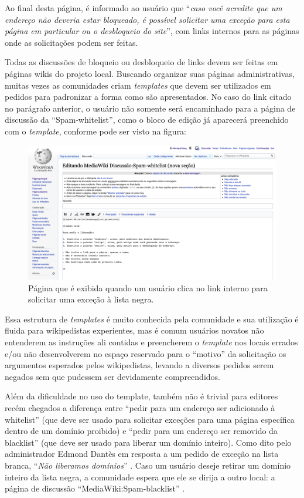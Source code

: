 Ao final desta página, é informado ao usuário que ``\textit{caso você acredite que um endereço não deveria estar bloqueado, é possível solicitar uma exceção para esta página em particular ou o desbloqueio do site}'', com links internos para as páginas onde as solicitações podem ser feitas.

Todas as discussões de bloqueio ou desbloqueio de links devem ser feitas em páginas wikis do projeto local. Buscando organizar suas páginas administrativas, muitas vezes as comunidades criam \textit{templates} que devem ser utilizados em pedidos para padronizar a forma como são apresentados. No caso do link citado no parágrafo anterior, o usuário não somente será encaminhado para a página de discussão da ``Spam-whitelist'', como o bloco de edição já aparecerá preenchido com o \textit{template}, conforme pode ser visto na figura:

\begin{figure}[H]
    \centering
    \includegraphics[width=1\textwidth]{Images/mediawiki_spam_whitelist.png}
    \caption{Página que é exibida quando um usuário clica no link interno para solicitar uma exceção à lista negra.}
    \label{fig:mediawiki_spam_whitelist}
\end{figure}

Essa estrutura de \textit{templates} é muito conhecida pela comunidade e sua utilização é fluida para wikipedistas experientes, mas é comum usuários novatos não entenderem as instruções ali contidas e preencherem o \textit{template} nos locais errados e/ou não desenvolverem no espaço reservado para o ``motivo'' da solicitação os argumentos esperados pelos wikipedistas, levando a diversos pedidos serem negados sem que pudessem ser devidamente compreendidos. 

Além da dificuldade no uso do template, também não é trivial para editores recém chegados a diferença entre ``pedir para um endereço ser adicionado à whitelist'' (que deve ser usado para solicitar exceções para uma página específica dentro de um domínio proibido) e ``pedir para um endereço ser removido da blacklist'' (que deve ser usado para liberar um domínio inteiro). Como dito pelo administrador Edmond Dantès em resposta a um pedido de exceção na lista branca, ``\textit{Não liberamos domínios}'' . Caso um usuário deseje retirar um domínio inteiro da lista negra, a comunidade espera que ele se dirija a outro local: a página de discussão ``MediaWiki:Spam-blacklist'' .

